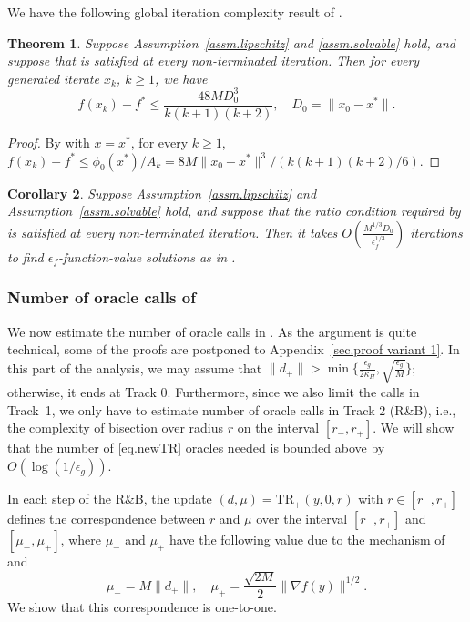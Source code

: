 \documentclass{article}
\newtheorem{theorem}{Theorem}[section]
\newtheorem{corollary}[theorem]{Corollary}
\numberwithin{equation}{section}
\newcommand{\trp}{\textrm{TR}_+}
\numberwithin{equation}{section}
\begin{document}
We have the following global iteration complexity result of .
\begin{theorem}
    \label{thm.convergence outer loop}
    Suppose Assumption~\ref{assm.lipschitz} and \ref{assm.solvable}
    hold, and suppose that  is satisfied at every non-terminated
    iteration. Then for every generated iterate $x_k$, $k\geq 1$, we have
    \[
        f(x_k)-f^*
        \leq
        \frac{48MD_0^3}{k(k+1)(k+2)}, \quad D_0 = \|x_0-x^*\|.
    \]
\end{theorem}
\begin{proof}
    By  with $x=x^*$, for every $k\ge1$, $f(x_k)-f^*\le \phi_0(x^*)/A_k=8M\|x_0-x^*\|^3/(k(k+1)(k+2)/6).$
\end{proof}
\begin{corollary}
    \label{coro.function value complexity}
    Suppose Assumption~\ref{assm.lipschitz} and Assumption~\ref{assm.solvable}
    hold, and suppose that the ratio condition required by
     is satisfied at every non-terminated
    iteration. Then it takes  $O\left(\frac{M^{1/3}D_0}{\epsilon_f^{1/3}}\right)$ iterations to find $\epsilon_f$-function-value solutions as in .
\end{corollary}
\subsubsection{Number of oracle calls of }\label{sec.line search}
We now estimate the number of oracle calls in .
As the argument is quite technical, some of the proofs are postponed to Appendix~\ref{sec.proof variant 1}.
In this part of the analysis, we may assume that $\|d_+\| > \min\{\frac{\epsilon_g}{2\kappa_H},\sqrt{\frac{\epsilon_g}{M}}\}$; otherwise, it ends at {Track 0}. Furthermore, since we also limit the calls in {Track~1}, we only have to estimate number of oracle calls in Track 2 (R\&B), i.e., the complexity of bisection over radius $r$ on the interval $[r_-,r_+]$. %
We will show that the number of \ref{eq.newTR} oracles needed is bounded above by $O\left(\log\left(1/{\epsilon_g}\right)\right)$.

In each step of the R\&B, the update $(d,\mu)=\trp(y,0,r)$ with $r\in[r_-,r_+]$ defines the correspondence between $r$ and $\mu$ over the interval $[r_-,r_+]$ and $[\mu_-,\mu_+]$, where $\mu_-$ and $\mu_+$ have the following value due to the mechanism of  and 
\begin{equation}\label{eq.value mu}
    \mu_- = M\|d_+\|, \quad \mu_+=\frac{\sqrt{2M}}{2}\|\nabla f(y)\|^{1/2}.
\end{equation}
We show that this correspondence is one-to-one.
\end{document}
